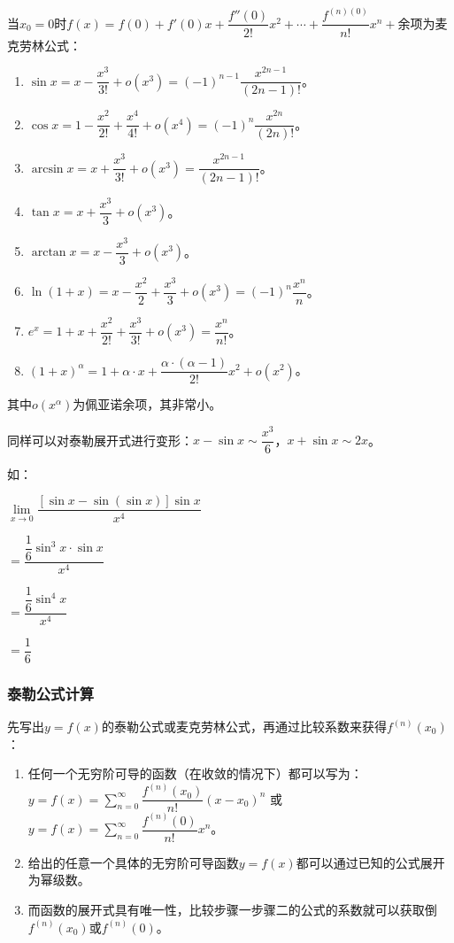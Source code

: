 \documentclass[UTF8, 12pt]{ctexart}
\begin{document}
当$x_0=0$时$f(x)=f(0)+f'(0)x+\dfrac{f''(0)}{2!}x^2+\cdots+\dfrac{f^{(n)(0)}}{n!}x^n+\text{余项}$为麦克劳林公式：

\begin{enumerate}
    \item $\sin x=x-\dfrac{x^3}{3!}+o(x^3)=(-1)^{n-1}\dfrac{x^{2n-1}}{(2n-1)!}$。
    \item $\cos x=1-\dfrac{x^2}{2!}+\dfrac{x^4}{4!}+o(x^4)=(-1)^n\dfrac{x^{2n}}{(2n)!}$。
    \item $\arcsin x=x+\dfrac{x^3}{3!}+o(x^3)=\dfrac{x^{2n-1}}{(2n-1)!}$。
    \item $\tan x=x+\dfrac{x^3}{3}+o(x^3)$。
    \item $\arctan x=x-\dfrac{x^3}{3}+o(x^3)$。
    \item $\ln(1+x)=x-\dfrac{x^2}{2}+\dfrac{x^3}{3}+o(x^3)=(-1)^n\dfrac{x^n}{n}$。
    \item $e^x=1+x+\dfrac{x^2}{2!}+\dfrac{x^3}{3!}+o(x^3)=\dfrac{x^n}{n!}$。
    \item $(1+x)^\alpha=1+\alpha\cdot x+\dfrac{\alpha\cdot(\alpha-1)}{2!}x^2+o(x^2)$。
\end{enumerate}

其中$o(x^\alpha)$为佩亚诺余项，其非常小。

同样可以对泰勒展开式进行变形：$x-\sin x\sim\dfrac{x^3}{6}$，$x+\sin x\sim 2x$。

如：

$\lim\limits_{x\to 0}\dfrac{[\sin x-\sin(\sin x)]\sin x}{x^4}$

$=\dfrac{\dfrac{1}{6}\sin^3x\cdot\sin x}{x^4}$

$=\dfrac{\dfrac{1}{6}\sin^4x}{x^4}$

$=\dfrac{1}{6}$

\subsubsection{泰勒公式计算}

先写出$y=f(x)$的泰勒公式或麦克劳林公式，再通过比较系数来获得$f^{(n)}(x_0)$：

\begin{enumerate}
    \item 任何一个无穷阶可导的函数（在收敛的情况下）都可以写为： \medskip \\
    $y=f(x)=\sum_{n=0}^\infty\dfrac{f^{(n)}(x_0)}{n!}(x-x_0)^n$ 或 $y=f(x)=\sum_{n=0}^\infty\dfrac{f^{(n)}(0)}{n!}x^n$。
    \item 给出的任意一个具体的无穷阶可导函数$y=f(x)$都可以通过已知的公式展开为幂级数。
    \item 而函数的展开式具有唯一性，比较步骤一步骤二的公式的系数就可以获取倒$f^{(n)}(x_0)$或$f^{(n)}(0)$。
\end{enumerate}
\end{document}
